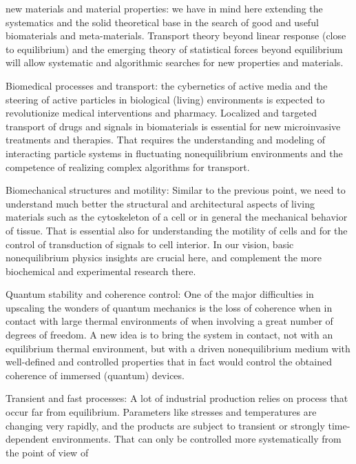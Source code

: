\begin{compactitem}
\item new materials and material properties: we have in mind here extending the systematics
  and the solid theoretical base in the search of good and useful biomaterials and
  meta-materials.  Transport theory beyond linear response (close to equilibrium) and the
  emerging theory of statistical forces beyond equilibrium will allow systematic and
  algorithmic searches for new properties and materials.
\item Biomedical processes and transport: the cybernetics of active media and the steering
  of active particles in biological (living) environments is expected to revolutionize
  medical interventions and pharmacy. Localized and targeted transport of drugs and signals
  in biomaterials is essential for new microinvasive treatments and therapies. That requires
  the understanding and modeling of interacting particle systems in fluctuating
  nonequilibrium environments and the competence of realizing complex algorithms for
  transport.
\item Biomechanical structures and motility: Similar to the previous point, we need to
  understand much better the structural and architectural aspects of living materials such
  as the cytoskeleton of a cell or in general the mechanical behavior of tissue.  That is
  essential also for understanding the motility of cells and for the control of transduction
  of signals to cell interior.  In our vision, basic nonequilibrium physics insights are
  crucial here, and complement the more biochemical and experimental research there.
\item Quantum stability and coherence control: One of the major difficulties in upscaling
  the wonders of quantum mechanics is the loss of coherence when in contact with large
  thermal environments of when involving a great number of degrees of freedom.  A new idea
  is to bring the system in contact, not with an equilibrium thermal environment, but with a
  driven nonequilibrium medium with well-defined and controlled properties that in fact
  would control the obtained coherence of immersed (quantum) devices.
\item Transient and fast processes: A lot of industrial production relies on process that
  occur far from equilibrium.  Parameters like stresses and temperatures are changing very
  rapidly, and the products are subject to transient or strongly time-dependent
  environments. That can only be controlled more systematically from the point of view of

\end{compactitem}
